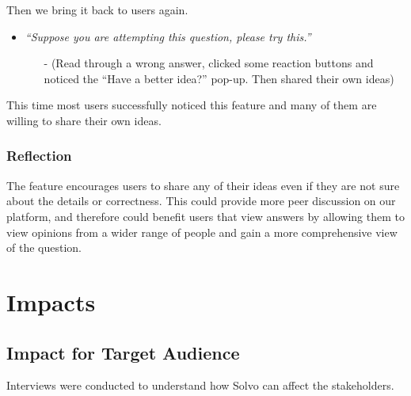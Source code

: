 \documentclass[a4paper]{article}
\begin{document}
    \noindent Then we bring it back to users again.

    \begin{itemize}
        \item \textit{``Suppose you are attempting this question, please try this.''}
        \begin{itemize}
            \item[-] (Read through a wrong answer, clicked some reaction buttons and noticed the ``Have a better idea?'' pop-up. Then shared their own ideas)
        \end{itemize}
    \end{itemize}

    This time most users successfully noticed this feature and many of them are willing to share their own ideas.

    \subsubsection*{Reflection}

    The feature encourages users to share any of their ideas even if they are not sure about the details or correctness.
    This could provide more peer discussion on our platform, and therefore could benefit users that view answers
    by allowing them to view opinions from a wider range of people and gain a more comprehensive view of the question.

    \section*{Impacts}

    \subsection*{Impact for Target Audience}

    \noindent Interviews were conducted to understand how Solvo can affect the stakeholders.
\end{document}
